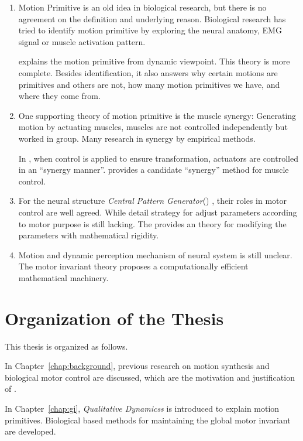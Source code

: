 \begin{enumerate}
\item 
Motion Primitive is an old idea in biological research, but there is no agreement on the definition and underlying reason.
Biological research has tried to identify motion primitive by exploring the neural anatomy, EMG signal or muscle activation pattern.

\moit  explains the motion primitive from dynamic viewpoint.
This theory is more complete.
Besides identification, it also answers why certain motions are primitives and others are not,
how many motion primitives we have,  and where they come from.

\item One supporting theory of motion primitive is the muscle synergy:
Generating motion by actuating muscles, muscles are not controlled independently but worked in group. 
Many research in synergy by empirical methods. 

In \moit, when control is applied to ensure transformation, actuators are controlled in an ``synergy manner''.
\moit provides a candidate  ``synergy'' method for muscle control.

\item For the neural structure \emph{Central Pattern Generator}(\cpg) , their roles in motor control are well agreed.
While detail strategy for adjust \cpg parameters according to motor purpose is still lacking.
The \moit provides an theory for modifying the \cpg parameters with mathematical rigidity.


\item  Motion and dynamic perception mechanism of neural system is still unclear.
The motor invariant theory proposes a computationally efficient mathematical machinery.
\end{enumerate}







\section{Organization of the Thesis}

This thesis is organized as follows.
 
In Chapter~\ref{chap:background}, previous research on motion synthesis and biological motor control are discussed, which are the motivation and justification of \moit.
 
In Chapter~\ref{chap:gi}, \emph{Qualitative Dynamicss} is introduced to explain motion primitives. 
Biological based  methods for maintaining the global motor invariant are developed.

